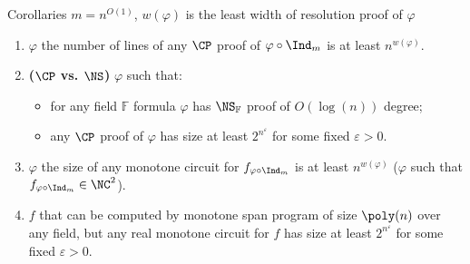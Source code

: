\begin{frame}{Corollaries}
    $m = n^{O(1)}$, $w(\varphi)$ is the least width of resolution proof of $\varphi$

    \pause
    \begin{enumerate}
        \item \ba $\varphi$ the number of lines of any $\CP$ proof of $\varphi \circ \Ind_m$ is at least
            $n^{w(\varphi)}$.
        \pause
        \item \textbf{($\CP$ vs. $\NS$)} \be $\varphi$ such that:
            \begin{itemize}
                \item for any field $\mathbb{F}$ formula $\varphi$ has $\NS_{\mathbb{F}}$ proof of
                    $O(\log(n))$ degree;
                \item any $\CP$ proof of $\varphi$ has size at least $2^{n^{\varepsilon}}$ for some fixed
                    $\varepsilon > 0$.
            \end{itemize}
        \pause
        \vspace{0.4cm}    
        \item \ba $\varphi$ the size of any monotone circuit for $f_{\varphi \circ \Ind_m}$ is at least
            $n^{w(\varphi)}$ (\be $\varphi$ such that $f_{\varphi \circ \Ind_m} \in \NC^2$).
        \pause
        \item \be $f$ that can be computed by monotone span program of size $\poly(n)$ over any field,
            but any real monotone circuit for $f$ has size at least $2^{n^{\varepsilon}}$ for some fixed
            $\varepsilon > 0$.
    \end{enumerate}
\end{frame}

